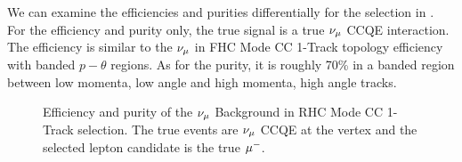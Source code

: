We can examine the efficiencies and purities differentially for the
selection in . For the efficiency
and purity only, the true signal is a true $\numu$ CCQE interaction.
The efficiency is similar to the $\numu$ in FHC Mode CC 1-Track topology
efficiency with banded $p-\theta$ regions. As for the purity, it
is roughly 70\% in a banded region between low momenta, low angle
and high momenta, high angle tracks.

\begin{figure}
\begin{centering}
\par\end{centering}
\caption[Efficiency and Purity of the $\numu$ Background in RHC Mode CC 1-Track
Selection]{Efficiency and purity of the $\protect\nu_{\mu}$ Background in RHC Mode
CC 1-Track selection. The true events are $\protect\nu_{\mu}$ CCQE at
the vertex and the selected lepton candidate is the true $\protect\mu^{-}$.
\label{fig:numuRHCCC1TrkRecoEffPur}}
\end{figure}

